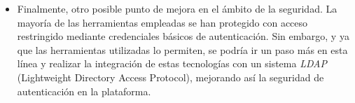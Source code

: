 \begin{itemize}
    \item Finalmente, otro posible punto de mejora en el ámbito de la seguridad. La mayoría de las herramientas empleadas se han protegido con acceso restringido mediante credenciales básicos de autenticación. Sin embargo, y ya que las herramientas utilizadas lo permiten, se podría ir un paso más en esta línea y realizar la integración de estas tecnologías con un sistema \textit{LDAP} (Lightweight Directory Access Protocol), mejorando así la seguridad de autenticación en la plataforma.

\end{itemize}
